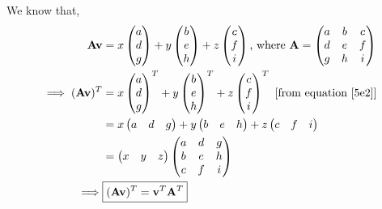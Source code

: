 \documentclass[12pt, letterpaper]{article}
\begin{document}
We know that,
\begin{equation}\label{5e3}\begin{split}
  \mathbf{Av} &= x\begin{pmatrix}a\\d\\g\end{pmatrix}
  + y\begin{pmatrix}b\\e\\h\end{pmatrix}
  + z\begin{pmatrix}c\\f\\i\end{pmatrix}
  \text{, where }\mathbf{A} = \begin{pmatrix} a&b&c\\d&e&f\\g&h&i \end{pmatrix}\\
  \implies (\mathbf{Av})^T &= x\begin{pmatrix}a\\d\\g\end{pmatrix}^T
  + y\begin{pmatrix}b\\e\\h\end{pmatrix}^T
  + z\begin{pmatrix}c\\f\\i\end{pmatrix}^T\,\,[\text{from equation \ref{5e2}}]\\
  &= x\begin{pmatrix}a&d&g\end{pmatrix}
  + y\begin{pmatrix}b&e&h\end{pmatrix}
  + z\begin{pmatrix}c&f&i\end{pmatrix}\\
  &= \begin{pmatrix} x&y&z \end{pmatrix}\begin{pmatrix} a&d&g\\b&e&h\\c&f&i \end{pmatrix}\\
  \implies &\boxed{(\mathbf{Av})^T =\mathbf{v}^T\mathbf{A}^T}
\end{split}\end{equation}
\end{document}
